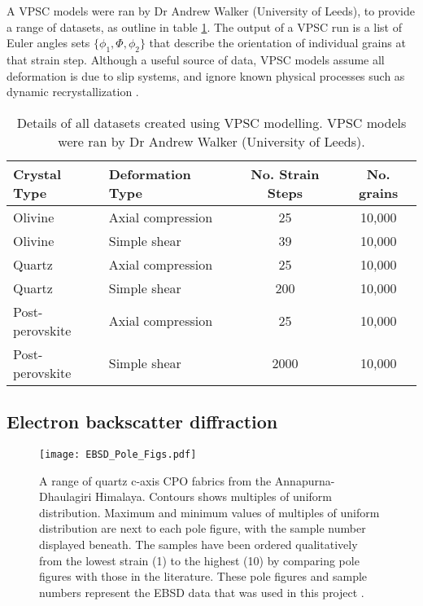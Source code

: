 \documentclass[a4paper,12pt,twoside]{report}
\numberwithin{equation}{chapter}
\begin{document}
A VPSC models were ran by Dr Andrew Walker (University of Leeds), to provide a range of datasets, as outline in table \ref{tab:VPSC_data}. The output of a VPSC run is a list of Euler angles sets $\{\phi_1,\Phi,\phi_2\}$ that describe the orientation of individual grains at that strain step. Although a useful source of data, VPSC models assume all deformation is due to slip systems, and ignore known physical processes such as dynamic recrystallization \citep[see,][]{Stipp2002}.      

\begin{table} 
	\centering
	\caption[VPSC datasets]{Details of all datasets created using VPSC modelling. VPSC models were ran by Dr Andrew Walker (University of Leeds).\\}
\begin{tabularx}{\textwidth}{X X c c}
	\hline
	\hline
	Crystal Type    & Deformation Type  & No. Strain Steps & No. grains \\
	\hline
	\hline
	Olivine         & Axial compression & 25   & 10,000 \\
	Olivine         & Simple shear      & 39   & 10,000 \\
	Quartz          & Axial compression & 25   & 10,000 \\
	Quartz          & Simple shear      & 200  & 10,000 \\
	Post-perovskite & Axial compression & 25   & 10,000 \\
	Post-perovskite & Simple shear      & 2000 & 10,000 \\
	\hline
	\end{tabularx}
\label{tab:VPSC_data}
\end{table}

\subsection{Electron backscatter diffraction}

\begin{figure}[h!]
  \centering
    \texttt{[image: EBSD\_Pole\_Figs.pdf]}
  \caption[EBSD data (pole figures)]{A range of quartz c-axis CPO fabrics from the Annapurna-Dhaulagiri Himalaya. Contours shows multiples of uniform distribution. Maximum and minimum values of multiples of uniform distribution are next to each pole figure, with the sample number displayed beneath. The samples have been ordered qualitatively from the lowest strain (1) to the highest (10) by comparing pole figures with those in the literature. These pole figures and sample numbers represent the EBSD data that was used in this project \citep[made available from][]{ParsonsThesis}.}
  \label{fig:EBSD_data}
\end{figure}  
    
\end{document}

